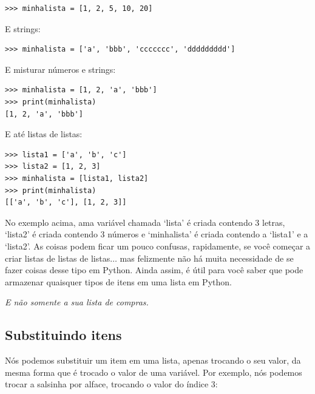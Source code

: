 \begin{listing}
\begin{verbatim}
>>> minhalista = [1, 2, 5, 10, 20]
\end{verbatim}
\end{listing}

\noindent
E strings:

\begin{listing}
\begin{verbatim}
>>> minhalista = ['a', 'bbb', 'ccccccc', 'ddddddddd']
\end{verbatim}
\end{listing}

\noindent
E misturar números e strings:

\begin{listing}
\begin{verbatim}
>>> minhalista = [1, 2, 'a', 'bbb']
>>> print(minhalista)
[1, 2, 'a', 'bbb']
\end{verbatim}
\end{listing}

\noindent
E até listas de listas:

\begin{listing}
\begin{verbatim}
>>> lista1 = ['a', 'b', 'c']
>>> lista2 = [1, 2, 3]
>>> minhalista = [lista1, lista2]
>>> print(minhalista)
[['a', 'b', 'c'], [1, 2, 3]]
\end{verbatim}
\end{listing}

No exemplo acima, ama variável chamada `lista' é criada contendo 3 letras, `lista2' é criada contendo 3 números e `minhalista' é criada contendo a `lista1' e a `lista2'. As coisas podem ficar um pouco confusas, rapidamente, se você começar a criar listas de listas de listas$\ldots$ mas felizmente não há muita necessidade de se fazer coisas desse tipo em Python. Ainda assim, é útil para você saber que pode armazenar quaisquer tipos de itens em uma lista em Python.

\noindent
\emph{E não somente a sua lista de compras.}

\subsection*{\color{BrickRed}Substituindo itens}

Nós podemos substituir um item em uma lista, apenas trocando o seu valor, da mesma forma que é trocado o valor de uma variável. Por exemplo, nós podemos trocar a salsinha por alface, trocando o valor do índice 3:

